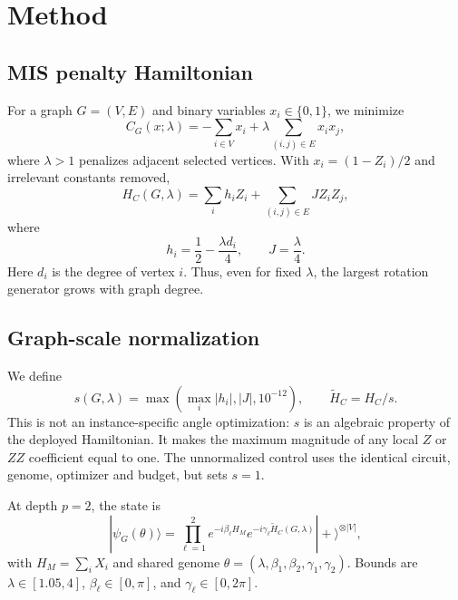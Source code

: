 \documentclass[10pt,twocolumn]{article}
\begin{document}
\section{Method}

\subsection{MIS penalty Hamiltonian}

For a graph $G=(V,E)$ and binary variables $x_i\in\{0,1\}$, we minimize
\begin{equation}
 C_G(x;\lambda)=-\sum_{i\in V}x_i+\lambda\sum_{(i,j)\in E}x_ix_j,
 \label{eq:qubo}
\end{equation}
where $\lambda>1$ penalizes adjacent selected vertices. With $x_i=(1-Z_i)/2$ and irrelevant constants removed,
\begin{equation}
 H_C(G,\lambda)=\sum_i h_i Z_i+\sum_{(i,j)\in E}JZ_iZ_j,
\end{equation}
where
\begin{equation}
 h_i=\frac{1}{2}-\frac{\lambda d_i}{4},\qquad J=\frac{\lambda}{4}.
 \label{eq:coefficients}
\end{equation}
Here $d_i$ is the degree of vertex $i$. Thus, even for fixed $\lambda$, the largest rotation generator grows with graph degree.

\subsection{Graph-scale normalization}

We define
\begin{equation}
 s(G,\lambda)=\max\left(\max_i |h_i|,|J|,10^{-12}\right),
 \qquad \widetilde H_C=H_C/s.
 \label{eq:normalization}
\end{equation}
This is not an instance-specific angle optimization: $s$ is an algebraic property of the deployed Hamiltonian. It makes the maximum magnitude of any local $Z$ or $ZZ$ coefficient equal to one. The unnormalized control uses the identical circuit, genome, optimizer and budget, but sets $s=1$.

At depth $p=2$, the state is
\begin{equation}
 |\psi_G(\theta)\rangle=\prod_{\ell=1}^{2}
 e^{-i\beta_\ell H_M}e^{-i\gamma_\ell\widetilde H_C(G,\lambda)}|+\rangle^{\otimes |V|},
\end{equation}
with $H_M=\sum_i X_i$ and shared genome
$\theta=(\lambda,\beta_1,\beta_2,\gamma_1,\gamma_2)$. Bounds are $\lambda\in[1.05,4]$, $\beta_\ell\in[0,\pi]$, and $\gamma_\ell\in[0,2\pi]$.
\end{document}
